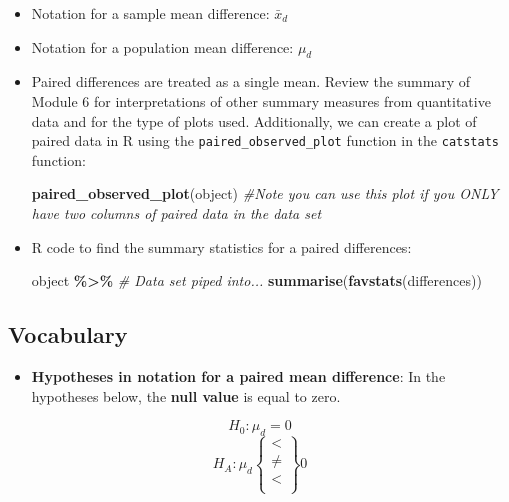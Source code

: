 \documentclass[
]{report}
\newenvironment{Shaded}{\begin{snugshade}}{\end{snugshade}}
\newcommand{\CommentTok}[1]{\textcolor[rgb]{0.56,0.35,0.01}{\textit{#1}}}
\newcommand{\FunctionTok}[1]{\textcolor[rgb]{0.13,0.29,0.53}{\textbf{#1}}}
\newcommand{\NormalTok}[1]{#1}
\newcommand{\SpecialCharTok}[1]{\textcolor[rgb]{0.81,0.36,0.00}{\textbf{#1}}}
\providecommand{\tightlist}{%
  \setlength{\itemsep}{0pt}\setlength{\parskip}{0pt}}
\begin{document}
\begin{itemize}
\item
  Notation for a sample mean difference: \(\bar{x}_d\)
\item
  Notation for a population mean difference: \(\mu_d\)
\item
  Paired differences are treated as a single mean. Review the summary of Module 6 for interpretations of other summary measures from quantitative data and for the type of plots used. Additionally, we can create a plot of paired data in R using the \texttt{paired\_observed\_plot} function in the \texttt{catstats} function:

\begin{Shaded}
\begin{Highlighting}[]
\FunctionTok{paired\_observed\_plot}\NormalTok{(object) }
\CommentTok{\#Note you can use this plot if you ONLY have two columns of paired data in the data set}
\end{Highlighting}
\end{Shaded}
\item
  R code to find the summary statistics for a paired differences:

\begin{Shaded}
\begin{Highlighting}[]
\NormalTok{object }\SpecialCharTok{\%\textgreater{}\%} \CommentTok{\# Data set piped into...}
    \FunctionTok{summarise}\NormalTok{(}\FunctionTok{favstats}\NormalTok{(differences))}
\end{Highlighting}
\end{Shaded}
\end{itemize}

\subsection{Vocabulary}\label{vocabulary-8}

\begin{itemize}
\tightlist
\item
  \textbf{Hypotheses in notation for a paired mean difference}: In the hypotheses below, the \textbf{null value} is equal to zero.
\end{itemize}

\[H_0: \mu_d = 0\]
\[H_A: \mu_d\left\{
\begin{array}{ll}
< \\
\ne \\
< \\
\end{array}
\right\}
0 \]
\end{document}
